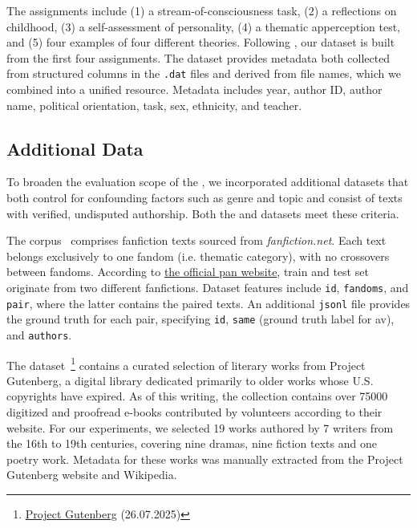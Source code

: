 The assignments include (1) a stream-of-consciousness task, (2) a reflections on childhood, (3) a self-assessment of personality, (4) a thematic apperception test, and (5) four examples of four different theories.
Following \citet{koppel_determining_2014}, our dataset is built from the first four assignments. 
The dataset provides metadata both collected from structured columns in the \texttt{.dat} files and derived from file names, which we combined into a unified resource. 
Metadata includes year, author ID, author name, political orientation, task, sex, ethnicity, and teacher.


\subsection{Additional Data}
\label{subsec:additional_data}
To broaden the evaluation scope of the \impAppr{}, we incorporated additional datasets that both control for confounding factors such as genre and topic and consist of texts with verified, undisputed authorship. 
Both the \dataPan{} and \dataGutenberg{} datasets meet these criteria.

The \dataPan{} corpus~\citep{bischoff_importance_2020} comprises fanfiction texts sourced from \textit{fanfiction.net}.
Each text belongs exclusively to one fandom (i.e. thematic category), with no crossovers between fandoms.
According to \href{https://pan.webis.de/clef20/pan20-web/author-identification.html}{the official \ac{pan} website}, 
train and test set originate from two different fanfictions.
Dataset features include \texttt{id}, \texttt{fandoms}, and \texttt{pair}, where the latter contains the paired texts.
An additional \texttt{jsonl} file provides the ground truth for each pair, specifying \texttt{id}, \texttt{same} (ground truth label for \ac{av}), and \texttt{authors}.

The \dataGutenberg{} dataset~\footnote{\href{https://www.gutenberg.org/}{Project Gutenberg} (26.07.2025)} contains a curated selection of literary works from Project Gutenberg, a digital library dedicated primarily to older works whose U.S. copyrights have expired.
As of this writing, the collection contains over \num{75000} digitized and proofread e-books contributed by volunteers according to their website.
For our experiments, we selected 19 works authored by 7 writers from the 16th to 19th centuries, covering nine dramas, nine fiction texts and one poetry work.
Metadata for these works was manually extracted from the Project Gutenberg website and Wikipedia.

